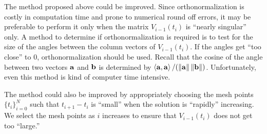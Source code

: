 \begin{rmk}
The method proposed above could be improved.  Since orthonormalization
is costly in computation time and prone to numerical round off errors,
it may be preferable to perform it only when the matrix $V_{i-1}(t_i)$ is
``nearly singular'' only.  A method to determine if orthonormalization
is required is to test for the size of the angles between the column
vectors of $V_{i-1}(t_i)$.  If the angles get ``too close'' to $0$,
orthonormalization should be used.  Recall that the cosine of the
angle between two vectors $\mathbf{a}$ and $\mathbf{b}$ is determined by
$\left\langle{\mathbf{a}} , {\mathbf{a}}\right\rangle / (\|\mathbf{a}\|\,\|\mathbf{b}\|)$.  Unfortunately,
even this method is kind of computer time intensive.

The method could also be improved by appropriately choosing the mesh
points $\{t_i\}_{i=0}^N$ such that $t_{i+1}-t_i$ is ``small'' when the
solution is ``rapidly'' increasing.  We select the mesh points as $i$
increases to ensure that $V_{i-1}(t_i)$ does not get too ``large.''
\end{rmk}

